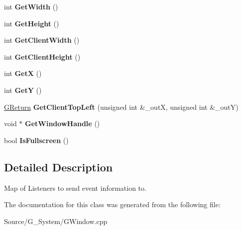 \begin{DoxyCompactItemize}
\item 
int {\bfseries Get\+Width} ()\hypertarget{classAppWindow_a794be3cebb059335a3df241a283c41ef}{}\label{classAppWindow_a794be3cebb059335a3df241a283c41ef}

\item 
int {\bfseries Get\+Height} ()\hypertarget{classAppWindow_a71fec5e59bc2df0bccf78e86f56cb99f}{}\label{classAppWindow_a71fec5e59bc2df0bccf78e86f56cb99f}

\item 
int {\bfseries Get\+Client\+Width} ()\hypertarget{classAppWindow_aafdfb9b1f11d5bc502dd943838184126}{}\label{classAppWindow_aafdfb9b1f11d5bc502dd943838184126}

\item 
int {\bfseries Get\+Client\+Height} ()\hypertarget{classAppWindow_a0a6b3d1d6908f9e061259424811c71c8}{}\label{classAppWindow_a0a6b3d1d6908f9e061259424811c71c8}

\item 
int {\bfseries GetX} ()\hypertarget{classAppWindow_a5a00e9f08623efadad1f7df64e51366a}{}\label{classAppWindow_a5a00e9f08623efadad1f7df64e51366a}

\item 
int {\bfseries GetY} ()\hypertarget{classAppWindow_a1ca90dd2449e994af85ec7ee58abc07b}{}\label{classAppWindow_a1ca90dd2449e994af85ec7ee58abc07b}

\item 
\hyperlink{namespaceGW_a67a839e3df7ea8a5c5686613a7a3de21}{G\+Return} {\bfseries Get\+Client\+Top\+Left} (unsigned int \&\+\_\+outX, unsigned int \&\+\_\+outY)\hypertarget{classAppWindow_a2dca1ccca246528cd923a5e268de67fc}{}\label{classAppWindow_a2dca1ccca246528cd923a5e268de67fc}

\item 
void $\ast$ {\bfseries Get\+Window\+Handle} ()\hypertarget{classAppWindow_ab9538e9f0787ddced89e559b4e6004b0}{}\label{classAppWindow_ab9538e9f0787ddced89e559b4e6004b0}

\item 
bool {\bfseries Is\+Fullscreen} ()\hypertarget{classAppWindow_a7da02dcf2708946a743882fb9ee94458}{}\label{classAppWindow_a7da02dcf2708946a743882fb9ee94458}

\end{DoxyCompactItemize}


\subsection{Detailed Description}
Map of Listeners to send event information to. 

The documentation for this class was generated from the following file\+:\begin{DoxyCompactItemize}
\item 
Source/\+G\+\_\+\+System/G\+Window.\+cpp\end{DoxyCompactItemize}
